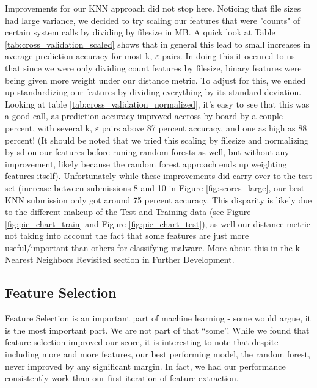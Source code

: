 \documentclass[letterpaper]{article}
\begin{document}
Improvements for our KNN approach did not stop here. Noticing that file sizes had large variance, we decided to try scaling our features that were "counts" of certain system calls by dividing by filesize in MB. A quick look at Table \ref{tab:cross_validation_scaled} shows that in general this lead to small increases in average prediction accuracy for most k, $\varepsilon$ pairs. In doing this it occured to us that since we were only dividing count features by filesize, binary features were being given more weight under our distance metric. To adjust for this, we ended up standardizing our features by dividing everything by its standard deviation. Looking at table \ref{tab:cross_validation_normalized}, it's easy to see that this was a good call, as prediction accuracy improved accross by board by a couple percent, with several k, $\varepsilon$ pairs above 87 percent accuracy, and one as high as 88 percent! (It should be noted that we tried this scaling by filesize and normalizing by sd on our features before runing random forests as well, but without any improvement, likely because the random forest approach ends up weighting features itself). Unfortunately while these improvements did carry over to the test set (increase between submissions 8 and 10 in Figure \ref{fig:scores_large}, our best KNN submission only got around 75 percent accuracy. This disparity is likely due to the different makeup of the Test and Training data (see Figure \ref{fig:pie_chart_train} and Figure \ref{fig:pie_chart_test}), as well our distance metric not taking into account the fact that some features are just more useful/important than others for classifying malware. More about this in the k-Nearest Neighbors Revisited section in Further Development.


\subsection{Feature Selection}
\noindent Feature Selection is an important part of machine learning - some would argue, it is the most important part. We are not part of that ``some''. While we found that feature selection improved our score, it is interesting to note that despite including more and more features, our best performing model, the random forest, never improved by any significant margin. In fact, we had our performance consistently work than our first iteration of feature extraction.\\
\end{document}
